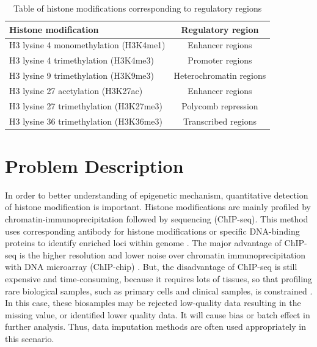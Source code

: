 \begin{table}[H]%
    \centering
    \begin{tabular}{lc}
        \hline
        Histone modification    & Regulatory region \\\hline
        H3 lysine 4 monomethylation (H3K4me1) & Enhancer regions \\
        H3 lysine 4 trimethylation (H3K4me3)   & Promoter regions \\
        H3 lysine 9 trimethylation (H3K9me3) & Heterochromatin regions \\
        H3 lysine 27 acetylation (H3K27ac) & Enhancer regions \\
        H3 lysine 27 trimethylation (H3K27me3) & Polycomb repression \\
        H3 lysine 36 trimethylation (H3K36me3) & Transcribed regions \\\hline
    \end{tabular}
    \captionsetup{labelfont=bf}
    \caption{Table of histone modifications corresponding to regulatory regions}
    \label{t1}
\end{table}

\section{Problem Description}
In order to better understanding of epigenetic mechanism, quantitative detection of histone modification is important. Histone modifications are mainly profiled by chromatin-immunoprecipitation followed by sequencing (ChIP-seq). This method uses corresponding antibody for histone modifications or specific DNA-binding proteins to identify enriched loci within genome \cite{nakato2020methods}. The major advantage of ChIP-seq is the higher resolution and lower noise over chromatin immunoprecipitation with DNA microarray (ChIP-chip) \cite{massie2012mapping}. But, the disadvantage of ChIP-seq is still expensive and time-consuming, because it requires lots of tissues, so that profiling rare biological samples, such as primary cells and clinical samples, is constrained \cite{gilfillan2012limitations}. In this case, these biosamples may be rejected low-quality data resulting in the missing value, or identified lower quality data. It will cause bias or batch effect in further analysis. Thus, data imputation methods are often used appropriately in this scenario.

